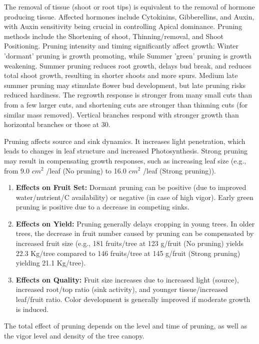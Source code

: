\vspace{0.5em}
The removal of tissue (shoot or root tips) is equivalent to the removal of hormone producing tissue. Affected hormones include Cytokinins, Gibberellins, and Auxin, with Auxin sensitivity being crucial in controlling Apical dominance.
Pruning methods include the Shortening of shoot, Thinning/removal, and Shoot Positioning. Pruning intensity and timing significantly affect growth: Winter 'dormant' pruning is growth promoting, while Summer 'green' pruning is growth weakening. Summer pruning reduces root growth, delays bud break, and reduces total shoot growth, resulting in shorter shoots and more spurs. Medium late summer pruning may stimulate flower bud development, but late pruning risks reduced hardiness. The regrowth response is stronger from many small cuts than from a few larger cuts, and shortening cuts are stronger than thinning cuts (for similar mass removed). Vertical branches respond with stronger growth than horizontal branches or those at 30\textdegree.

\vspace{0.5em}
Pruning affects source and sink dynamics. It increases light penetration, which leads to changes in leaf structure and increased Photosynthesis. Strong pruning may result in compensating growth responses, such as increasing leaf size (e.g., from 9.0 $cm^2$ /leaf (No pruning) to 16.0 $cm^2$ /leaf (Strong pruning)). 
 
\begin{enumerate} 
    \item \textbf{Effects on Fruit Set:} Dormant pruning can be positive (due to improved water/nutrient/C availability) or negative (in case of high vigor). Early green pruning is positive due to a decrease in competing sinks. 
    \item \textbf{Effects on Yield:} Pruning generally delays cropping in young trees. In older trees, the decrease in fruit number caused by pruning can be compensated by increased fruit size (e.g., 181 fruits/tree at 123 g/fruit (No pruning) yields 22.3 Kg/tree compared to 146 fruits/tree at 145 g/fruit (Strong pruning) yielding 21.1 Kg/tree). 
    \item \textbf{Effects on Quality:} Fruit size increases due to increased light (source), increased root/top ratio (sink activity), and younger tissue/increased leaf/fruit ratio. Color development is generally improved if moderate growth is induced. 
\end{enumerate} 

\vspace{0.5em}
The total effect of pruning depends on the level and time of pruning, as well as the vigor level and density of the tree canopy.

